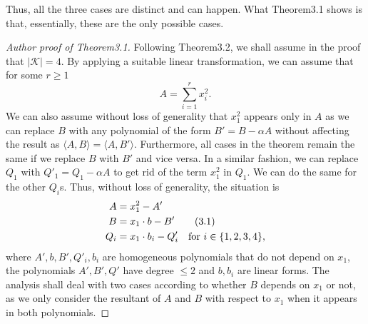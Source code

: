 Thus, all the three cases are distinct and can happen. What Theorem3.1 shows is that, essentially, these are the only possible cases.
\begin{proof}[Author proof of Theorem3.1]
Following Theorem3.2, we shall assume in the proof that $|\mathcal K|=4$. By applying a suitable linear transformation, we can assume that for some $r\geq1$
\[A=\sum_{i=1}^rx_i^2.\]
We can also assume without loss of generality that $x_1^2$ appears only in $A$ as we can replace $B$ with any polynomial of the form $B'=B-\alpha A$ without affecting the result as $\langle A,B\rangle=\langle A,B'\rangle$. Furthermore, all cases in the theorem remain the same if we replace $B$ with $B'$ and vice versa.
In a similar fashion, we can replace $Q_1$ with $Q'_1=Q_1-\alpha A$ to get rid of the term $x_1^2$ in $Q_1$. We can do the same for the other $Q_i$s. Thus, without loss of generality, the situation is
\begin{align}A&=x_1^2-A'\notag\\B&=x_1\cdot b-B'\tag{3.1}\\Q_i&=x_1\cdot b_i-Q'_i\quad\text{for }i\in\{1,2,3,4\},\notag\end{align}
where $A',b,B',Q'_i,b_i$ are homogeneous polynomials that do not depend on $x_1$, the polynomials $A',B',Q'$ have degree $\leq2$ and $b,b_i$ are linear forms. The analysis shall deal with two cases according to whether $B$ depends on $x_1$ or not, as we only consider the resultant of $A$ and $B$ with respect to $x_1$ when it appears in both polynomials.

\end{proof}
